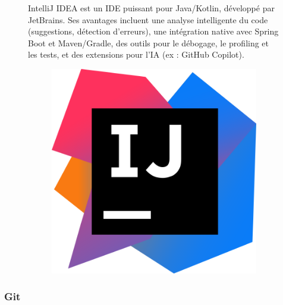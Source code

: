 \documentclass[12pt,a4paper]{report}
\begin{document}
	\begin{figure}[H]
		\begin{minipage}{0.8\textwidth}
			IntelliJ IDEA est un IDE puissant pour Java/Kotlin, développé par JetBrains. Ses avantages incluent une analyse intelligente du code (suggestions, détection d’erreurs), une intégration native avec Spring Boot et Maven/Gradle, des outils pour le débogage, le profiling et les tests, et des extensions pour l’IA (ex : GitHub Copilot).
		\end{minipage}
		\hfill
		\begin{minipage}{0.15\textwidth} 
			\begin{figure}[H]
				\centering
				\includegraphics[width=\linewidth]{intellij-logo.png}
				\label{fig:intellij-logo}
			\end{figure}
		\end{minipage}
	\end{figure}
	
	\subsubsection{Git}
	
\end{document}
